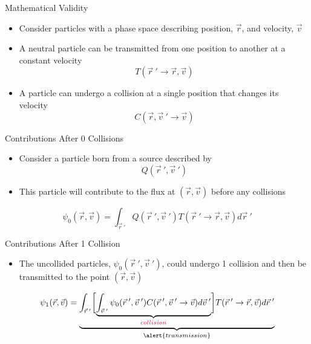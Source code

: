 \documentclass[xcolor=x11names,compress,handout]{beamer}
\renewcommand{\(}{\begin{columns}}
\renewcommand{\)}{\end{columns}}
\newcommand{\<}[1]{\begin{column}{#1}}
\renewcommand{\>}{\end{column}}
\begin{document}
\begin{frame}{Mathematical Validity}

\begin{itemize}
\item Consider particles with a phase space
describing position, $\vec{r}$, and velocity, $\vec{v}$
\vspace*{0.5 em}
\item A neutral particle can be transmitted
from one position to another at a
constant velocity
\[T(\vec{r}\:' \rightarrow \vec{r}, \vec{v})\]

\item A particle can undergo a collision at a
single position that changes its velocity
\[C(\vec{r}, \vec{v}\:' \rightarrow \vec{v})\]
\end{itemize}

\end{frame}


\begin{frame}{Contributions After 0 Collisions}

\begin{itemize}
\item Consider a particle born from a source
described by 
\[Q(\vec{r}\:', \vec{v}\:')\]
\item This particle will contribute to the flux at $(\vec{r}, \vec{v})$ before any collisions
\end{itemize}

\[\psi_0(\vec{r}, \vec{v}) = \int_{\vec{r}\:'} Q(\vec{r}\:', \vec{v}\:')T(\vec{r}\:' \rightarrow \vec{r}, \vec{v}) d\vec{r}\:'\]

\end{frame}


\begin{frame}{Contributions After 1 Collision}

\begin{itemize}
\item The uncollided particles, $\psi_0(\vec{r}\:', \vec{v}\:')$, could undergo 1 \textcolor{cardinal}{collision} and then be \alert{transmitted} to the point $(\vec{r}, \vec{v})$
\end{itemize}

\[\psi_1(\vec{r}, \vec{v}) = \underbrace{\int_{\vec{r}\:'} \biggl[ \underbrace{\int_{\vec{v}\:'} \psi_0(\vec{r}\:', \vec{v}\:') C(\vec{r}\:', \vec{v}\:' \rightarrow \vec{v})  d\vec{v}\:'}_{\textcolor{cardinal}{collision}}\biggr] T(\vec{r}\:' \rightarrow \vec{r}, \vec{v}) d\vec{r}\:'}_{\alert{transmission}}\]

\end{frame}
\end{document}
